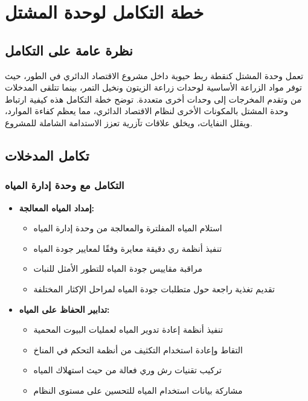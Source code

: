 \section{خطة التكامل لوحدة المشتل}

\subsection{نظرة عامة على التكامل}
تعمل وحدة المشتل كنقطة ربط حيوية داخل مشروع الاقتصاد الدائري في الطور، حيث توفر مواد الزراعة الأساسية لوحدات زراعة الزيتون ونخيل التمر، بينما تتلقى المدخلات من وتقدم المخرجات إلى وحدات أخرى متعددة. توضح خطة التكامل هذه كيفية ارتباط وحدة المشتل بالمكونات الأخرى لنظام الاقتصاد الدائري، مما يعظم كفاءة الموارد، ويقلل النفايات، ويخلق علاقات تآزرية تعزز الاستدامة الشاملة للمشروع.

\subsection{تكامل المدخلات}

\subsubsection{التكامل مع وحدة إدارة المياه}
\begin{itemize}
    \item \textbf{إمداد المياه المعالجة:}
    \begin{itemize}
        \item استلام المياه المفلترة والمعالجة من وحدة إدارة المياه
        \item تنفيذ أنظمة ري دقيقة معايرة وفقًا لمعايير جودة المياه
        \item مراقبة مقاييس جودة المياه للتطور الأمثل للنبات
        \item تقديم تغذية راجعة حول متطلبات جودة المياه لمراحل الإكثار المختلفة
    \end{itemize}
    
    \item \textbf{تدابير الحفاظ على المياه:}
    \begin{itemize}
        \item تنفيذ أنظمة إعادة تدوير المياه لعمليات البيوت المحمية
        \item التقاط وإعادة استخدام التكثيف من أنظمة التحكم في المناخ
        \item تركيب تقنيات رش وري فعالة من حيث استهلاك المياه
        \item مشاركة بيانات استخدام المياه للتحسين على مستوى النظام
    \end{itemize}
\end{itemize}

